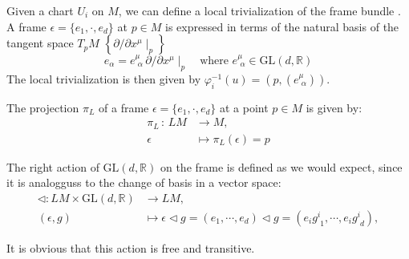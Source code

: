 Given a chart \(U_i\) on \( M \), we can define a local trivialization of the frame bundle \cite{NakaharaGeometrytopologyphysics2005}. A frame $\epsilon = \{e_1, \cdot, e_d\}$ at $p\in M$ is expressed in terms of the natural basis of the tangent space \(T_pM\) \( \left\{ \partial / \partial x^\mu \mid_p \right\} \)
\[ e_\alpha = e^\mu_{\,\,\alpha} \, \partial/\partial x^\mu \mid_p \quad \text{where }e^\mu_{\,\,\alpha} \in \mathrm{GL}(d, \mathbb{R}) \]
The local trivialization is then given by \( \varphi_i^{-1}(u)=(p,(e^\mu_{\,\,\alpha}))\).

The projection $\pi_L$ of a frame $\epsilon = \{e_1, \cdot, e_d\}$ at a point \(p\in M\) is given by:
\begin{align*}
  \pi_L \, : \, LM &\longrightarrow M, \\
        \epsilon &\mapsto \pi_L(\epsilon)=p
\end{align*}

The right action of \( \mathrm{GL}(d,\mathbb{R}) \) on the frame is defined as we would expect, since it is analogguss to the change of basis in a vector space:
\begin{align*}
  \triangleleft : LM \times \mathrm{GL}(d,\mathbb{R}) &\longrightarrow LM, \\
  (\epsilon, g) &\mapsto \epsilon \triangleleft g = (e_1, \cdots, e_d) \triangleleft g = (e_i g^i_{\,\,1}, \cdots, e_i g^i_{\,\,d}),
\end{align*}

It is obvious that this action is free and transitive.
